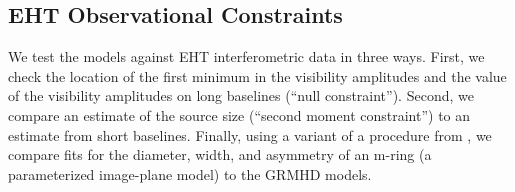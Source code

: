 \subsection{EHT Observational Constraints}




We test the models against EHT interferometric data in three ways.  First, we  check the location of the first minimum in the visibility amplitudes and the value of the visibility amplitudes on long baselines (``null constraint'').  Second, we compare an estimate of the source size (``second moment constraint'') to an estimate from short baselines.  Finally, using a variant of a procedure from , we compare fits for the diameter, width, and asymmetry of an m-ring (a parameterized image-plane model) to the GRMHD models.

